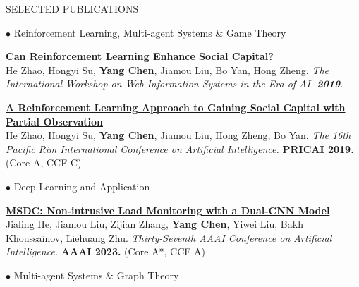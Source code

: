 \documentclass{resume} %
\begin{document}
\begin{rSection}{SELECTED PUBLICATIONS}
\begin{rSubsection}{\large $\bullet$ Reinforcement Learning, Multi-agent Systems \& Game Theory}{}{}{}
		\item {\href{https://link.springer.com/chapter/10.1007/978-981-15-3281-8_14}{\bf Can Reinforcement Learning Enhance Social Capital?}}\\
		He Zhao, Hongyi Su, \textbf{Yang Chen}, Jiamou Liu, Bo Yan, Hong Zheng. {\em The International Workshop on Web Information Systems in the Era of AI. {\bf 2019}.}
		\item {\href{https://link.springer.com/chapter/10.1007/978-3-030-29908-8_9}{\bf A Reinforcement Learning Approach to Gaining Social Capital with Partial Observation}}\\
		He Zhao, Hongyi Su, \textbf{Yang Chen}, Jiamou Liu, Hong Zheng, Bo Yan. {\em The 16th Pacific Rim International Conference on Artificial Intelligence.} \textbf{PRICAI 2019.} (Core A, CCF C) 
\end{rSubsection}


\begin{rSubsection}{\large $\bullet$ Deep Learning and Application}{}{}{}
\item {
	\href{}{\bf MSDC: Non-intrusive Load Monitoring with a Dual-CNN Model}}\\
		Jialing He, Jiamou Liu, Zijian Zhang, \textbf{Yang Chen}, Yiwei Liu, Bakh Khoussainov, Liehuang Zhu. {\em Thirty-Seventh AAAI Conference on Artificial Intelligence.} \textbf{AAAI 2023.} (Core A*, CCF A)
\end{rSubsection}


\begin{rSubsection}{\large $\bullet$ Multi-agent Systems \& Graph Theory}{}{}{}
	

\end{rSubsection}
\end{rSection}
\end{document}
